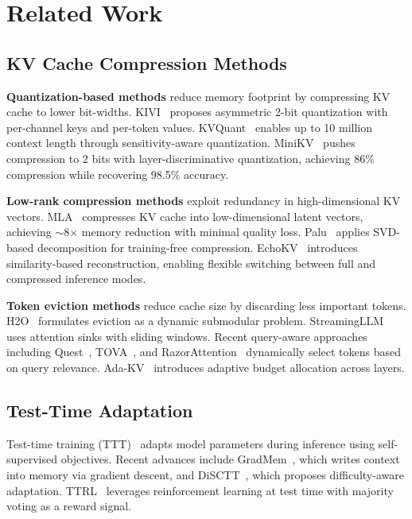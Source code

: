 \documentclass[11pt,a4paper]{article}
\theoremstyle{plain}
\theoremstyle{definition}
\begin{document}
\section{Related Work}
\label{sec:related}

\subsection{KV Cache Compression Methods}

\textbf{Quantization-based methods} reduce memory footprint by compressing KV cache to lower bit-widths. KIVI~\cite{liu2024kivi} proposes asymmetric 2-bit quantization with per-channel keys and per-token values. KVQuant~\cite{hooper2024kvquant} enables up to 10 million context length through sensitivity-aware quantization. MiniKV~\cite{sharma2025minikv} pushes compression to 2 bits with layer-discriminative quantization, achieving 86\% compression while recovering 98.5\% accuracy.

\textbf{Low-rank compression methods} exploit redundancy in high-dimensional KV vectors. MLA~\cite{deepseek2024mla} compresses KV cache into low-dimensional latent vectors, achieving $\sim$8$\times$ memory reduction with minimal quality loss. Palu~\cite{chang2025palu} applies SVD-based decomposition for training-free compression. EchoKV~\cite{ji2026echokv} introduces similarity-based reconstruction, enabling flexible switching between full and compressed inference modes.

\textbf{Token eviction methods} reduce cache size by discarding less important tokens. H2O~\cite{zhang2023h2o} formulates eviction as a dynamic submodular problem. StreamingLLM~\cite{xiao2024streamingllm} uses attention sinks with sliding windows. Recent query-aware approaches including Quest~\cite{tang2024quest}, TOVA~\cite{he2025tova}, and RazorAttention~\cite{tang2025razor} dynamically select tokens based on query relevance. Ada-KV~\cite{yuan2024adakv} introduces adaptive budget allocation across layers.

\subsection{Test-Time Adaptation}
Test-time training (TTT)~\cite{sun2020} adapts model parameters during inference using self-supervised objectives. Recent advances include GradMem~\cite{kuratov2026gradmem}, which writes context into memory via gradient descent, and DiSCTT~\cite{disctt2026}, which proposes difficulty-aware adaptation. TTRL~\cite{zuo2025ttrl} leverages reinforcement learning at test time with majority voting as a reward signal.
\end{document}
